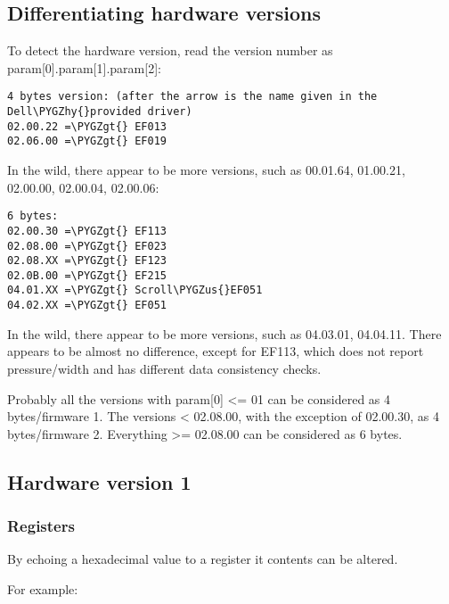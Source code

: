 \documentclass[a4paper,8pt,english]{sphinxmanual}
\def\PYGZus{\char`\_}
\def\PYGZgt{\char`\>}
\def\PYGZhy{\char`\-}
\begin{document}
\subsection{Differentiating hardware versions}
\label{input/devices/elantech:differentiating-hardware-versions}
To detect the hardware version, read the version number as param{[}0{]}.param{[}1{]}.param{[}2{]}:

\begin{Verbatim}[commandchars=\\\{\}]
4 bytes version: (after the arrow is the name given in the Dell\PYGZhy{}provided driver)
02.00.22 =\PYGZgt{} EF013
02.06.00 =\PYGZgt{} EF019
\end{Verbatim}

In the wild, there appear to be more versions, such as 00.01.64, 01.00.21,
02.00.00, 02.00.04, 02.00.06:

\begin{Verbatim}[commandchars=\\\{\}]
6 bytes:
02.00.30 =\PYGZgt{} EF113
02.08.00 =\PYGZgt{} EF023
02.08.XX =\PYGZgt{} EF123
02.0B.00 =\PYGZgt{} EF215
04.01.XX =\PYGZgt{} Scroll\PYGZus{}EF051
04.02.XX =\PYGZgt{} EF051
\end{Verbatim}

In the wild, there appear to be more versions, such as 04.03.01, 04.04.11. There
appears to be almost no difference, except for EF113, which does not report
pressure/width and has different data consistency checks.

Probably all the versions with param{[}0{]} \textless{}= 01 can be considered as
4 bytes/firmware 1. The versions \textless{} 02.08.00, with the exception of 02.00.30, as
4 bytes/firmware 2. Everything \textgreater{}= 02.08.00 can be considered as 6 bytes.


\subsection{Hardware version 1}
\label{input/devices/elantech:hardware-version-1}

\subsubsection{Registers}
\label{input/devices/elantech:registers}
By echoing a hexadecimal value to a register it contents can be altered.

For example:
\end{document}
